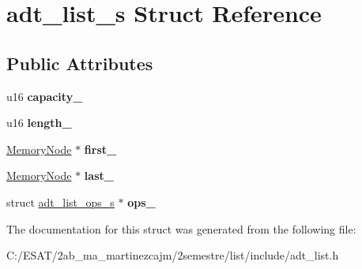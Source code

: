 \hypertarget{structadt__list__s}{}\section{adt\+\_\+list\+\_\+s Struct Reference}
\label{structadt__list__s}
\subsection*{Public Attributes}
\begin{DoxyCompactItemize}
\item 
\mbox{\label{structadt__list__s_a28abce1b272b24577f7f2cfb8b30f284}} 
u16 {\bfseries capacity\+\_\+}
\item 
\mbox{\label{structadt__list__s_a3b2d787a9fed1c2335a2c8a0c87cf7ed}} 
u16 {\bfseries length\+\_\+}
\item 
\mbox{\label{structadt__list__s_af4e0067db571e13c5f3404faf03dfa22}} 
\hyperlink{structmemory__node__s}{Memory\+Node} $\ast$ {\bfseries first\+\_\+}
\item 
\mbox{\label{structadt__list__s_a1b0512f5315d5595e891d04ca0ebf692}} 
\hyperlink{structmemory__node__s}{Memory\+Node} $\ast$ {\bfseries last\+\_\+}
\item 
\mbox{\label{structadt__list__s_a84b714473c4a5d549dec7a4e33d1ee4b}} 
struct \hyperlink{structadt__list__ops__s}{adt\+\_\+list\+\_\+ops\+\_\+s} $\ast$ {\bfseries ops\+\_\+}
\end{DoxyCompactItemize}


The documentation for this struct was generated from the following file\+:\begin{DoxyCompactItemize}
\item 
C\+:/\+E\+S\+A\+T/2ab\+\_\+ma\+\_\+martinezcajm/2semestre/list/include/adt\+\_\+list.\+h\end{DoxyCompactItemize}
